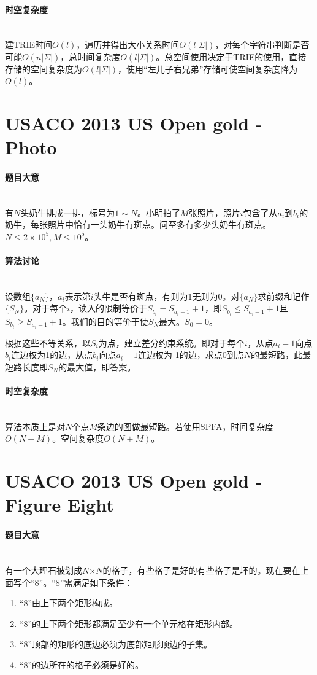 \documentclass[UTF8]{ctexart}
\newcommand{\myparagraph}[1]{\paragraph{#1}\mbox{}\\}
\theoremstyle{nonumberplain}
\begin{document}
		\myparagraph{时空复杂度}
		
			建TRIE时间$O(l)$，遍历并得出大小关系时间$O(l|\Sigma|)$，对每个字符串判断是否可能$O(n|\Sigma|)$，总时间复杂度$O(l|\Sigma|)$。总空间使用决定于TRIE的使用，直接存储的空间复杂度为$O(l|\Sigma|)$，使用“左儿子右兄弟”存储可使空间复杂度降为$O(l)$。
	
	\section{USACO 2013 US Open gold - Photo}
	
		\myparagraph{题目大意}
		
			有$N$头奶牛排成一排，标号为$1 \sim N$。小明拍了$M$张照片，照片$i$包含了从$a_i$到$b_i$的奶牛，每张照片中恰有一头奶牛有斑点。问至多有多少头奶牛有斑点。$N \leq 2 \times 10^5, M \leq 10^5$。
			
		\myparagraph{算法讨论}
		
			设数组$\{a_N\}$，$a_i$表示第$i$头牛是否有斑点，有则为1无则为0。对$\{a_N\}$求前缀和记作$\{S_N\}$。对于每个$i$，读入的限制等价于$S_{b_i}=S_{a_i-1}+1$，即$S_{b_i} \leq S_{a_i-1}+1$且$S_{b_i} \geq S_{a_i-1}+1$。我们的目的等价于使$S_N$最大。$S_0=0$。
			
			根据这些不等关系，以$S_i$为点，建立差分约束系统。即对于每个$i$，从点$a_i-1$向点$b_i$连边权为1的边，从点$b_i$向点$a_i-1$连边权为-1的边，求点0到点$N$的最短路，此最短路长度即$S_N$的最大值，即答案。
	
		\myparagraph{时空复杂度}
		
			算法本质上是对$N$个点$M$条边的图做最短路。若使用SPFA，时间复杂度$O(N+M)$。空间复杂度$O(N+M)$。
	
	\section{USACO 2013 US Open gold - Figure Eight}
	
		\myparagraph{题目大意}
		
			有一个大理石被划成$N$×$N$的格子，有些格子是好的有些格子是坏的。现在要在上面写个“8”。“8”需满足如下条件：
			
			\begin{enumerate}
				\item “8”由上下两个矩形构成。
				\item “8”的上下两个矩形都满足至少有一个单元格在矩形内部。
				\item “8”顶部的矩形的底边必须为底部矩形顶边的子集。
				\item “8”的边所在的格子必须是好的。
			\end{enumerate}
			
\end{document}
